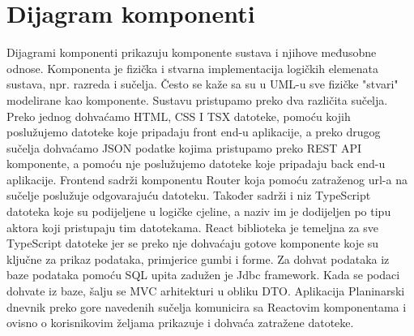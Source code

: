 			
		
			
			
		
		
			\section{Dijagram komponenti}
		Dijagrami komponenti prikazuju komponente sustava i njihove međusobne odnose. Komponenta je fizička i stvarna implementacija logičkih elemenata sustava, npr. razreda i sučelja. Često se kaže sa su u UML-u sve fizičke "stvari" modelirane kao komponente. Sustavu pristupamo preko dva različita sučelja. Preko jednog dohvaćamo HTML, CSS I TSX datoteke, pomoću kojih poslužujemo datoteke koje pripadaju front end-u aplikacije, a preko drugog sučelja dohvaćamo JSON podatke kojima pristupamo preko REST API komponente, a pomoću nje poslužujemo datoteke koje pripadaju back end-u aplikacije. Frontend sadrži komponentu Router koja pomoću zatraženog url-a na sučelje poslužuje odgovarajuću datoteku. Također sadrži i niz TypeScript datoteka koje su podijeljene u logičke cjeline, a naziv im je dodijeljen po tipu aktora koji pristupaju tim datotekama. React biblioteka je temeljna za sve TypeScript datoteke jer se preko nje dohvaćaju gotove komponente koje su ključne za prikaz podataka, primjerice gumbi i forme. Za dohvat podataka iz baze podataka pomoću SQL upita zadužen je Jdbc framework. Kada se podaci dohvate iz baze, šalju se MVC arhitekturi u obliku DTO. Aplikacija Planinarski dnevnik preko gore navedenih sučelja komunicira sa Reactovim komponentama i ovisno o korisnikovim željama prikazuje i dohvaća zatražene datoteke.
		
